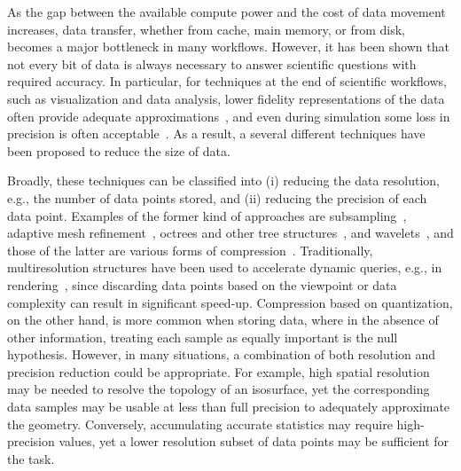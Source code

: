 As the gap between the available compute power and the cost of data movement increases, data
transfer, whether from cache, main memory, or from disk, becomes a major bottleneck in many
workflows. However, it has been shown that not every bit of data is always necessary to answer
scientific questions with required accuracy. In particular, for techniques at the end of scientific
workflows, such as visualization and data analysis, lower fidelity representations of the data often
provide adequate approximations~\cite{woodring2011,covra2012,compression_sim2013}, and even during
simulation some loss in precision is often
acceptable~\cite{compression_sim2013,doi:10.1177/1094342018762036}. As a result, a several different
techniques have been proposed to reduce the size of data. 

Broadly, these techniques can be classified into (i) reducing the data resolution, e.g., the number
of data points stored, and (ii) reducing the precision of each data point. Examples of the former
kind of approaches are subsampling~\cite{idx2001}, adaptive mesh refinement~\cite{amr1989}, octrees
and other tree structures~\cite{hierarchical1984}, and wavelets~\cite{woodring2011}, and those of
the latter are various forms of
compression~\cite{fpzip,isabela,zfp2014,sz,vq1992,compression_domain2003,sqe}. Traditionally,
multiresolution structures have been used to accelerate dynamic queries, e.g., in
rendering~\cite{multires_octree1999}, since discarding data points based on the viewpoint or data
complexity can result in significant speed-up. Compression based on quantization, on the other hand,
is more common when storing data, where in the absence of other information, treating each sample as
equally important is the null hypothesis. However, in many situations, a combination of both
resolution and precision reduction could be appropriate. For example, high spatial resolution may be
needed to resolve the topology of an isosurface, yet the corresponding data samples may be usable at
less than full precision to adequately approximate the geometry. Conversely, accumulating accurate
statistics may require high-precision values, yet a lower resolution subset of data points may be
sufficient for the task. 


